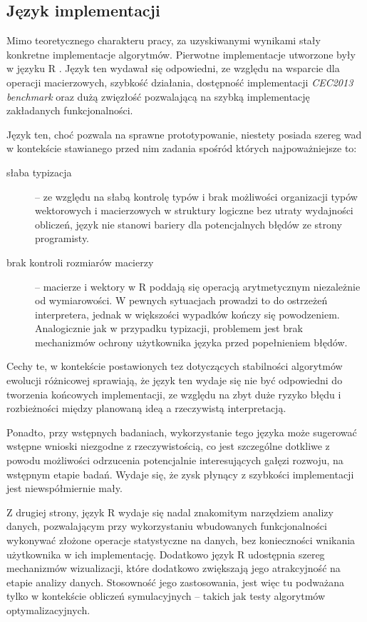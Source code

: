 \documentclass[12pt,a4paper]{report}
\begin{document}
{{{{{{\subsection{Język implementacji}
\label{jezykdoimpl}
\par{
Mimo teoretycznego charakteru pracy, za uzyskiwanymi wynikami stały konkretne implementacje algorytmów. Pierwotne implementacje utworzone były w języku R \cite{Rlang}. Język ten wydawał się odpowiedni, ze względu na wsparcie dla operacji macierzowych, szybkość działania, dostępność implementacji \emph{CEC2013 benchmark} oraz dużą zwięzłość pozwalającą na szybką implementację zakładanych funkcjonalności.
}
\par{
Język ten, choć pozwala na sprawne prototypowanie, niestety posiada szereg wad w kontekście stawianego przed nim zadania spośród których najpoważniejsze to:
\begin{description}
\item[słaba typizacja] -- ze względu na słabą kontrolę typów i brak możliwości organizacji typów wektorowych i macierzowych w struktury logiczne bez utraty wydajności obliczeń, język nie stanowi bariery dla potencjalnych błędów ze strony programisty.
\item[brak kontroli rozmiarów macierzy] -- macierze i wektory w R poddają się operacją arytmetycznym niezależnie od wymiarowości. W pewnych sytuacjach prowadzi to do ostrzeżeń interpretera, jednak w większości wypadków kończy się powodzeniem. Analogicznie jak w przypadku typizacji, problemem jest brak mechanizmów ochrony użytkownika języka przed popełnieniem błędów. 
\end{description}
Cechy te, w kontekście postawionych tez dotyczących stabilności algorytmów ewolucji różnicowej sprawiają, że język ten wydaje się nie być odpowiedni do tworzenia końcowych implementacji, ze względu na zbyt duże ryzyko błędu i rozbieżności między planowaną ideą a rzeczywistą interpretacją.
}
\par{
Ponadto, przy wstępnych badaniach, wykorzystanie tego języka może sugerować wstępne wnioski niezgodne z rzeczywistością, co jest szczególne dotkliwe z powodu możliwości odrzucenia potencjalnie interesujących gałęzi rozwoju, na wstępnym etapie badań. Wydaje się, że zysk płynący z szybkości implementacji jest niewspółmiernie mały.
}
\par{
Z drugiej strony, język R wydaje się nadal znakomitym narzędziem analizy danych, pozwalającym przy wykorzystaniu wbudowanych funkcjonalności wykonywać złożone operacje statystyczne na danych, bez konieczności wnikania użytkownika w ich implementację. Dodatkowo język R udostępnia szereg mechanizmów wizualizacji, które dodatkowo zwiększają jego atrakcyjność na etapie analizy danych. Stosowność jego zastosowania, jest więc tu podważana tylko w kontekście obliczeń symulacyjnych -- takich jak testy algorytmów optymalizacyjnych.
}}}}}}}
\end{document}
